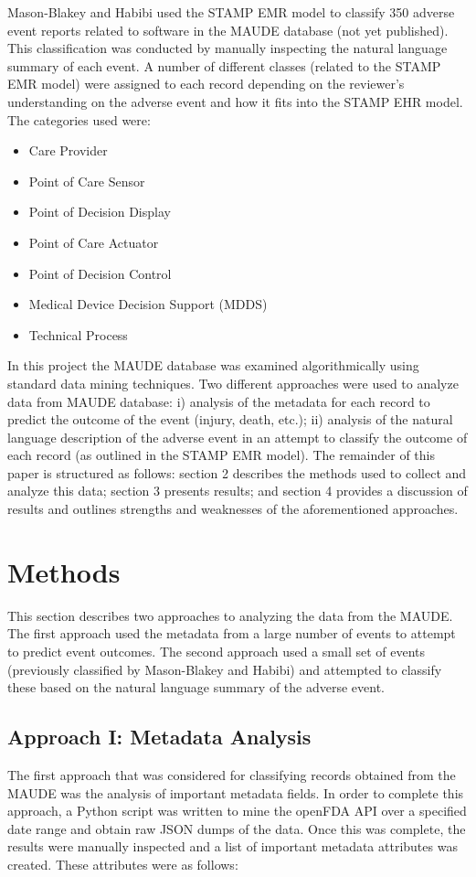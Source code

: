 \documentclass[11pt, notitlepage,abstracton,oneside]{article}   	%
\begin{document}
Mason-Blakey and Habibi used the STAMP EMR model to classify 350 adverse event reports related to software in the MAUDE database (not yet published). This classification was conducted by manually inspecting the natural language summary of each event. A number of different classes (related to the STAMP EMR model) were assigned to each record depending on the reviewer's understanding on the adverse event and how it fits into the STAMP EHR model. The categories used were: 

\begin{itemize}
	\item Care Provider
	\item Point of Care Sensor
	\item Point of Decision Display
	\item Point of Care Actuator
	\item Point of Decision Control
	\item Medical Device Decision Support (MDDS)
	\item Technical Process
\end{itemize}

In this project the MAUDE database was examined algorithmically using standard data mining techniques. Two different approaches were used to analyze data from MAUDE database:  i) analysis of the metadata for each record to predict the outcome of the event (injury, death, etc.); ii) analysis of the natural language description of the adverse event in an attempt to classify the outcome of each record (as outlined in the STAMP EMR model). The remainder of this paper is structured as follows: section 2 describes the methods used to collect and analyze this data; section 3 presents results; and section 4 provides a discussion of results and outlines strengths and weaknesses of the aforementioned approaches. 

\section{Methods}
This section describes two approaches to analyzing the data from the MAUDE. The first approach used the metadata from a large number of events to attempt to predict event outcomes. The second approach used a small set of events (previously classified by Mason-Blakey and Habibi) and attempted to classify these based on the natural language summary of the adverse event.

\subsection{Approach I: Metadata Analysis}
The first approach that was considered for classifying records obtained from the MAUDE was the analysis of important metadata fields. In order to complete this approach, a Python script was written to mine the openFDA API over a specified date range and obtain raw JSON dumps of the data. Once this was complete, the results were manually inspected and a list of important metadata attributes was created. These attributes were as follows:
\end{document}
